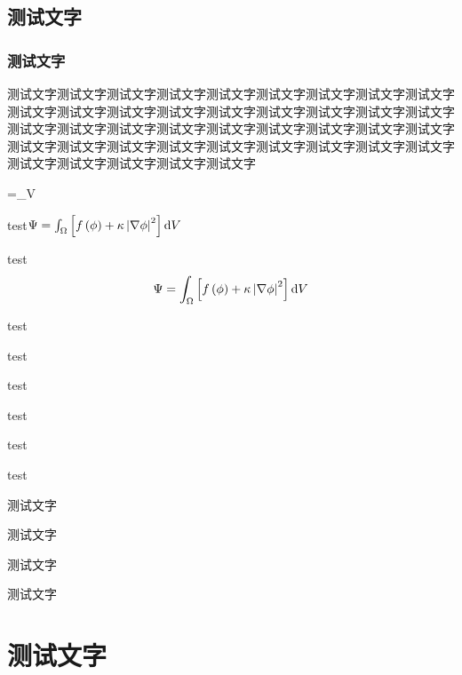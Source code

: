 \subsection{测试文字}
\subsubsection{测试文字}


\begin{Example}
	测试文字测试文字测试文字测试文字测试文字测试文字测试文字测试文字测试文字测试文字测试文字测试文字测试文字测试文字测试文字测试文字测试文字测试文字测试文字测试文字测试文字测试文字测试文字测试文字测试文字测试文字测试文字测试文字测试文字测试文字测试文字测试文字测试文字测试文字测试文字测试文字测试文字测试文字测试文字测试文字测试文字
	\begin{flalign}
		\Psi=\int_\Omega{}V
	\end{flalign}
\end{Example}




\Improve
\begin{QuestionItem}[2]
	\item test$\Psi=\int_\Omega\left[f\left(\phi\right)+\kappa\left|\nabla\phi\right|^2\right]{\rm d}V$
	\item test
	$$\Psi=\int_\Omega\left[f\left(\phi\right)+\kappa\left|\nabla\phi\right|^2\right]{\rm d}V$$
	\item test
	\item test
	\item test
	\item test
	\item test
	\item test
\end{QuestionItem}


\Thinking
\begin{QuestionItem}
	\item 测试文字
	\item 测试文字
	\item 测试文字
	\item 测试文字
\end{QuestionItem}






\section{测试文字}


